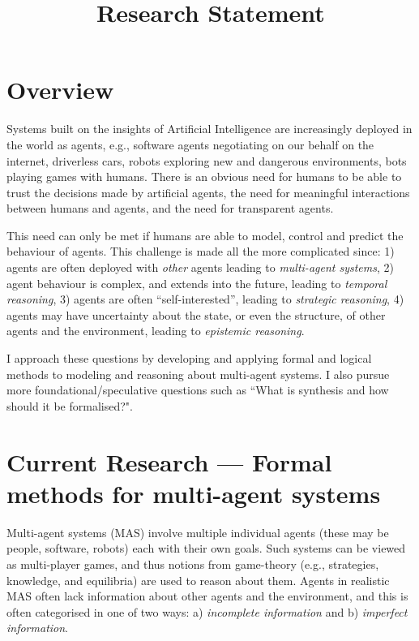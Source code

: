 \documentclass[10pt,a4paper,sans]{moderncv}
\title{Research Statement}
\begin{document}
\makecvtitle



\section{Overview}
Systems built on the insights of Artificial Intelligence are increasingly deployed in
the world as agents, e.g., software agents negotiating on our behalf on the internet, driverless cars, robots
exploring new and dangerous environments, bots playing games with humans. There is an obvious need
for humans to be able to trust the decisions made by artificial agents, the need for meaningful interactions
between humans and agents, and the need for transparent agents.
\newline

This need can only be met if humans are able to model, control and predict the {behaviour} of agents. This challenge is made 
all the more complicated since: 1) agents are often deployed with \emph{other} agents leading to \emph{multi-agent systems}, 2) agent behaviour is complex, and extends into the future, leading to \emph{temporal reasoning}, 3)  agents are often ``self-interested'', leading to \emph{strategic reasoning}, 4)
agents may have uncertainty about the state, or even the structure, of other agents and the environment, leading to \emph{epistemic reasoning}.
\newline

I approach these questions by developing and applying formal and logical methods to modeling and reasoning about multi-agent systems.
I also pursue more foundational/speculative questions such as ``What is synthesis and how should it be formalised?".



\section{Current Research --- Formal methods for multi-agent systems}
Multi-agent systems (MAS) involve multiple individual agents (these may be people, software, robots) each with their own goals. Such systems can be viewed as multi-player games, and thus notions from game-theory (e.g., strategies, knowledge, and equilibria) are used to reason about them. Agents in realistic MAS often lack information about other agents and the environment, and this is often categorised in one of two ways: a) \emph{incomplete information} and b) \emph{imperfect information}.
\newline
\end{document}
